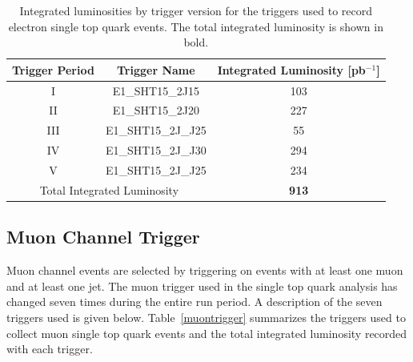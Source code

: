 \vspace{0.2in}
\begin{table}[!h!tbp]
\begin{center}
\caption{Integrated luminosities by trigger version for the triggers used to record electron single top quark events. The total integrated luminosity is shown in bold.}
\label{electrontrigger}
\begin{tabular}{cc|c}
Trigger Period	&	Trigger Name		&	Integrated Luminosity [pb$^{-1}$]	\\
\hline
I	&	E1\_SHT15\_2J15		&	103 \\ 
II	&	E1\_SHT15\_2J20		&	227 \\ 
III	&	E1\_SHT15\_2J\_J25	&	55 \\
IV	&	E1\_SHT15\_2J\_J30	&	294 \\ 
V	&	E1\_SHT15\_2J\_J25	&	234 \\
\hline
\multicolumn{2}{c|}{Total Integrated Luminosity}
                                   &  {\bf 913} \\
\end{tabular}
\vspace{-0.1 in}
\end{center}
\end{table}


\subsection{Muon Channel Trigger}

Muon channel events are selected by triggering on events with at least one muon and at least one jet. The muon trigger used in the single top quark analysis has changed seven times during the entire run period. A description of the seven triggers used is given below. Table~\ref{muontrigger} summarizes the triggers used to collect muon single top quark events and the total integrated luminosity recorded with each trigger.

